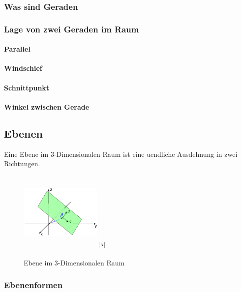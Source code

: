 \documentclass[a4paper]{article} %
\begin{document}
	\subsubsection{Was sind Geraden}
	\subsubsection{Lage von zwei Geraden im Raum}
	\paragraph{Parallel}
	\paragraph{Windschief}
	\paragraph{Schnittpunkt}
	\paragraph{Winkel zwischen Gerade}
	\subsection{Ebenen}
	Eine Ebene im 3-Dimensionalen Raum ist eine uendliche Ausdehnung in zwei Richtungen.
	\begin{figure}[H]
				\includegraphics[width=150px, height=150px]{Ebene.png}$^{[5]}$
					\captionsetup{labelformat=empty}
				\caption{Ebene im 3-Dimensionalen Raum}
	\end{figure}
	\subsubsection{Ebenenformen}
\end{document}
